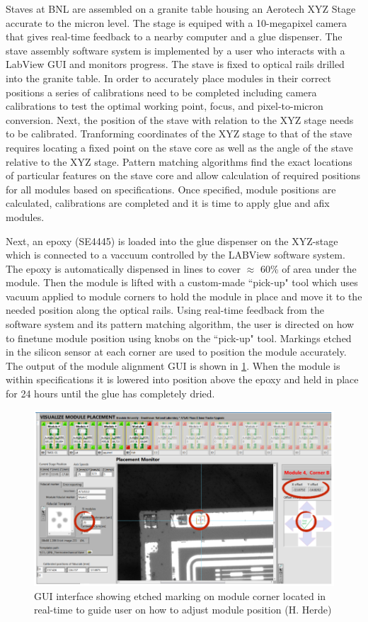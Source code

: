 Staves at BNL are assembled on a granite table housing an Aerotech XYZ Stage accurate to the micron level. The stage is equiped with a 10-megapixel camera that gives real-time feedback to a nearby computer and a glue dispenser. The stave assembly software system is implemented by a user who interacts with a LabView GUI and monitors progress. The stave is fixed to optical rails drilled into the granite table. In order to accurately place modules in their correct positions a series of calibrations need to be completed including camera calibrations to test the optimal working point, focus, and pixel-to-micron conversion. Next, the position of the stave with relation to the XYZ stage needs to be calibrated. Tranforming coordinates of the XYZ stage to that of the stave requires locating a fixed point on the stave core as well as the angle of the stave relative to the XYZ stage. Pattern matching algorithms find the exact locations of particular features on the stave core and allow calculation of required positions for all modules based on specifications. Once specified, module positions are calculated, calibrations are completed and it is time to apply glue and afix modules. 

Next, an epoxy (SE4445) is loaded into the glue dispenser on the XYZ-stage which is connected to a vaccuum controlled by the LABView software system. The epoxy is automatically dispensed in lines to cover $\approx$ 60\% of area under the module. Then the module is lifted with a custom-made ``pick-up" tool which uses vacuum applied to module corners to hold the module in place and move it to the needed position along the optical rails. Using real-time feedback from the software system and its pattern matching algorithm, the user is directed on how to finetune module position using knobs on the ``pick-up" tool. Markings etched in the silicon sensor at each corner are used to position the module accurately. The output of the module alignment GUI is shown in \ref{fig:modulealignment}. When the module is within specifications it is lowered into position above the epoxy and held in place for 24 hours until the glue has completely dried.

\begin{figure}[!h]
        \centering
    \includegraphics[width=.6\textwidth]{Pictures/labviewscreen.png}
    \caption{GUI interface showing etched marking on module corner located in real-time to guide user on how to adjust module position (H. Herde)}
    \label{fig:modulealignment}
\end{figure}

